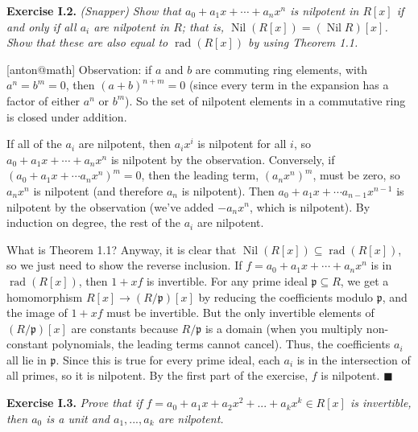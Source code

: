 \documentclass{article}
\makeatletter
\newcommand\<{\triangleleft}
\DeclareMathOperator{\nil}{Nil}
\DeclareMathOperator{\rad}{rad}
\newenvironment{exercise}[1]{\gdef\currentEx{#1}\begin{trivlist}\item[]%
                \textbf{Exercise #1.} \it}{\end{trivlist}}
\newenvironment{solution}[1]{\def\x{#1}\begin{trivlist}\item[]\hspace*{-.5em}[\x]}
                {\hspace*{\fill} $\blacksquare$
                \protected@write0{}{\currentEx, \x}
                \end{trivlist}}
\makeatother
\begin{document}
 \begin{exercise}{I.2}
   (Snapper) Show that $a_0 + a_1x + \cdots + a_n x^n$ is nilpotent in $R[x]$ if
   and only if all $a_i$ are nilpotent in $R$; that is, $\nil (R[x])=(\nil R)[x]$. Show
   that these are also equal to $\rad (R[x])$ by using Theorem 1.1.
 \end{exercise}
 \begin{solution}{anton@math}
   Observation: if $a$ and $b$ are commuting ring elements, with $a^n=b^m=0$, then
   $(a+b)^{n+m}=0$ (since every term in the expansion has a factor of either $a^n$ or
   $b^m$). So the set of nilpotent elements in a commutative ring is closed under
   addition.

   If all of the $a_i$ are nilpotent, then $a_i x^i$ is nilpotent for all $i$, so
   $a_0+a_1x+\cdots +a_nx^n$ is nilpotent by the observation. Conversely, if
   $(a_0+a_1x+\cdots a_nx^n)^m=0$, then the leading term, $(a_n x^n)^m$, must be zero, so
   $a_nx^n$ is nilpotent (and therefore $a_n$ is nilpotent). Then $a_0+a_1x+\cdots
   a_{n-1}x^{n-1}$ is nilpotent by the observation (we've added $-a_nx^n$, which is
   nilpotent). By induction on degree, the rest of the $a_i$ are nilpotent.

   What is Theorem 1.1? Anyway, it is clear that $\nil (R[x])\subseteq \rad (R[x])$, so
   we just need to show the reverse inclusion. If $f=a_0+a_1x+\cdots + a_nx^n$ is in
   $\rad(R[x])$, then $1+xf$ is invertible. For any prime ideal $\mathfrak p\subseteq R$,
   we get a homomorphism $R[x]\to (R/\mathfrak p) [x]$ by reducing the coefficients
   modulo $\mathfrak p$, and the image of $1+xf$ must be invertible. But the only
   invertible elements of $(R/\mathfrak p)[x]$ are constants because $R/\mathfrak p$ is a
   domain (when you multiply non-constant polynomials, the leading terms cannot
   cancel). Thus, the coefficients $a_i$ all lie in $\mathfrak p$. Since this is true for
   every prime ideal, each $a_i$ is in the intersection of all primes, so it is
   nilpotent. By the first part of the exercise, $f$ is nilpotent.
 \end{solution}

 \begin{exercise}{I.3} %
    Prove that if $f=a_0+a_1x+a_2x^2+...+a_kx^k \in R[x]$ is
    invertible, then $a_0$ is a unit and $a_1,...,a_k$ are nilpotent.
 \end{exercise}
\end{document}
